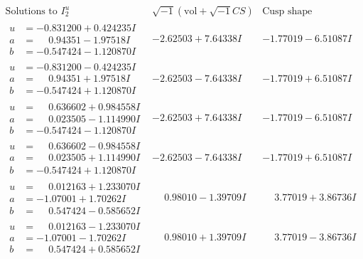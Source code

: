 \documentclass[1p]{elsarticle_modified}
\theoremstyle{definition}
\newcommand{\I}{\sqrt{-1}}
\begin{document}
$$\begin{array}{c|c|c}  
\text{Solutions to }I^u_{2}& \I (\text{vol} + \sqrt{-1}CS) & \text{Cusp shape}\\
 \hline 
\begin{aligned}
u &= -0.831200 + 0.424235 I \\
a &= \phantom{-}0.94351 - 1.97518 I \\
b &= -0.547424 - 1.120870 I\end{aligned}
 & -2.62503 + 7.64338 I & -1.77019 - 6.51087 I \\ \hline\begin{aligned}
u &= -0.831200 - 0.424235 I \\
a &= \phantom{-}0.94351 + 1.97518 I \\
b &= -0.547424 + 1.120870 I\end{aligned}
 & -2.62503 - 7.64338 I & -1.77019 + 6.51087 I \\ \hline\begin{aligned}
u &= \phantom{-}0.636602 + 0.984558 I \\
a &= \phantom{-}0.023505 - 1.114990 I \\
b &= -0.547424 - 1.120870 I\end{aligned}
 & -2.62503 + 7.64338 I & -1.77019 - 6.51087 I \\ \hline\begin{aligned}
u &= \phantom{-}0.636602 - 0.984558 I \\
a &= \phantom{-}0.023505 + 1.114990 I \\
b &= -0.547424 + 1.120870 I\end{aligned}
 & -2.62503 - 7.64338 I & -1.77019 + 6.51087 I \\ \hline\begin{aligned}
u &= \phantom{-}0.012163 + 1.233070 I \\
a &= -1.07001 + 1.70262 I \\
b &= \phantom{-}0.547424 - 0.585652 I\end{aligned}
 & \phantom{-}0.98010 - 1.39709 I & \phantom{-}3.77019 + 3.86736 I \\ \hline\begin{aligned}
u &= \phantom{-}0.012163 - 1.233070 I \\
a &= -1.07001 - 1.70262 I \\
b &= \phantom{-}0.547424 + 0.585652 I\end{aligned}
 & \phantom{-}0.98010 + 1.39709 I & \phantom{-}3.77019 - 3.86736 I \\ \hline\begin{aligned}

\end{aligned}
\end{array}$$
\end{document}

